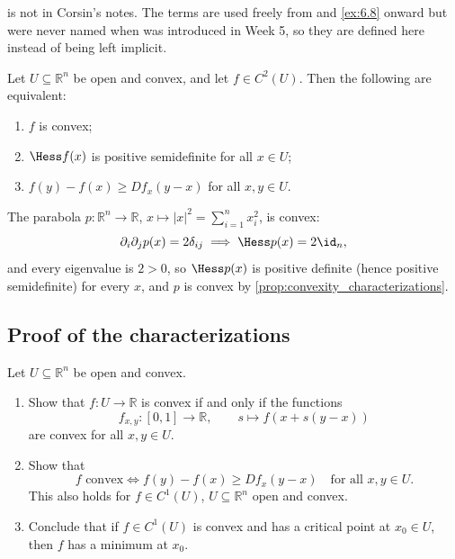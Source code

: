 \begin{ainote}
 is not in Corsin's notes. The terms are used freely from
 and \cref{ex:6.8} onward but were never named when
 was introduced in Week 5, so they are defined here instead of
being left implicit.
\end{ainote}

\begin{proposition}
\label{prop:convexity_characterizations}
Let $U \subseteq \mathbb{R}^n$ be open and convex, and let $f \in C^2(U)$. Then the following are
equivalent:
\begin{enumerate}[label=\textbf{(\alph*)}]
  \item $f$ is convex;
  \item $\Hess f(x)$ is positive semidefinite for all $x \in U$;
  \item $f(y)-f(x) \geq Df_x(y-x)$ for all $x,y \in U$.
\end{enumerate}
\end{proposition}

\begin{example}
The parabola $p : \mathbb{R}^n \to \mathbb{R}$, $x \mapsto |x|^2 = \sum_{i=1}^n x_i^2$, is convex:
\[\partial_i\partial_j p(x) = 2\delta_{ij} \implies \Hess p(x) = 2\id_n,\]
and every eigenvalue is $2>0$, so $\Hess p(x)$ is positive definite (hence positive semidefinite)
for every $x$, and $p$ is convex by \cref{prop:convexity_characterizations}.
\end{example}

\subsection{Proof of the characterizations}

\begin{exercise}
\label{ex:convexity_characterizations}
Let $U \subseteq \mathbb{R}^n$ be open and convex.
\begin{enumerate}[label=\textbf{(\alph*)}]
  \item Show that $f : U \to \mathbb{R}$ is convex if and only if the functions
    \[f_{x,y} : [0,1] \to \mathbb{R}, \qquad s \mapsto f(x+s(y-x))\]
    are convex for all $x,y \in U$.
  \item Show that
    \[f \text{ convex} \iff f(y)-f(x) \geq Df_x(y-x) \quad \text{for all } x,y \in U.\]
    This also holds for $f \in C^1(U)$, $U \subseteq \mathbb{R}^n$ open and convex.
  \item Conclude that if $f \in C^1(U)$ is convex and has a critical point at $x_0 \in U$, then $f$
    has a minimum at $x_0$.
\end{enumerate}
\end{exercise}

